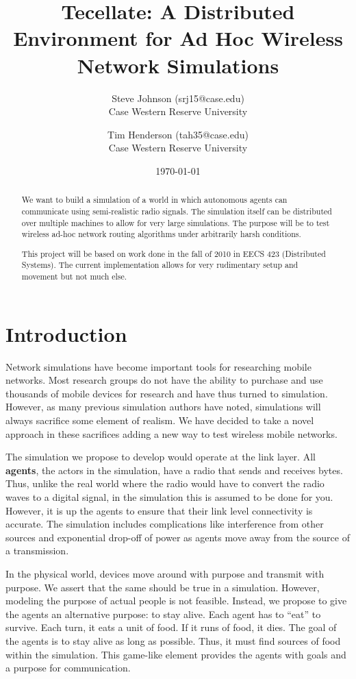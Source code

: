 \documentclass[12pt]{article}
\title{Tecellate: A Distributed Environment for Ad Hoc Wireless Network Simulations}
\author{
        Steve Johnson (srj15@case.edu)\\
        Case Western Reserve University\\
        \and Tim Henderson (tah35@case.edu)\\
        Case Western Reserve University
}
\date{\today}
\begin{document}
\doublespacing
\maketitle


\begin{abstract}
    We want to build a simulation of a world in which autonomous agents can communicate using
    semi-realistic radio signals. The simulation itself can be distributed over multiple machines to
    allow for very large simulations. The purpose will be to test wireless ad-hoc network routing
    algorithms under arbitrarily harsh conditions.

    This project will be based on work done in the fall of 2010 in EECS 423 (Distributed Systems).
    The current implementation allows for very rudimentary setup and movement but not much else.
\end{abstract}

\section{Introduction}

Network simulations have become important tools for researching mobile networks. Most research
groups do not have the ability to purchase and use thousands of mobile devices for research and have
thus turned to simulation. However, as many previous simulation authors have noted, simulations will
always sacrifice some element of realism. We have decided to take a novel approach in these
sacrifices adding a new way to test wireless mobile networks.

The simulation we propose to develop would operate at the link layer. All \textbf{agents}, the
actors in the simulation, have a radio that sends and receives bytes. Thus, unlike the real world
where the radio would have to convert the radio waves to a digital signal, in the simulation this is
assumed to be done for you. However, it is up the agents to ensure that their link level
connectivity is accurate. The simulation includes complications like interference from other sources
and exponential drop-off of power as agents move away from the source of a transmission.

In the physical world, devices move around with purpose and transmit with purpose. We assert that
the same should be true in a simulation. However, modeling the purpose of actual people is not
feasible. Instead, we propose to give the agents an alternative purpose: to stay alive. Each agent
has to ``eat'' to survive. Each turn, it eats a unit of food. If it runs of food, it dies. The goal
of the agents is to stay alive as long as possible. Thus, it must find sources of food within the
simulation. This game-like element provides the agents with goals and a purpose for communication.
\end{document}
